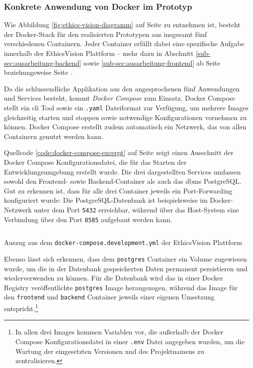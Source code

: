 \documentclass[a4paper,12pt,twoside]{scrreprt}
\begin{document}
\subsubsection*{Konkrete Anwendung von Docker im Prototyp}
\label{anwendung-docker}

Wie Abbildung \ref{fig:ethics-vision-diagramm} auf Seite \pageref{fig:ethics-vision-diagramm} zu entnehmen ist, besteht der Docker-Stack für den realisierten Prototypen aus insgesamt fünf verschiedenen Containern. Jeder Container erfüllt dabei eine spezifische Aufgabe innerhalb der EthicsVision Plattform -- mehr dazu in Abschnitt \ref{sub-sec:ausarbeitung-backend} sowie \ref{sub-sec:ausarbeitung-frontend} ab Seite \pageref{sub-sec:ausarbeitung-backend} beziehungsweise Seite \pageref{sub-sec:ausarbeitung-frontend}.

\medskip

Da die schlussendliche Applikation aus den angesprochenen fünf Anwendungen und Services besteht, kommt \textit{Docker Compose} zum Einsatz. Docker Compose stellt ein \ac{cli} Tool sowie ein \texttt{.yaml} Dateiformat zur Verfügung, um mehrere Images gleichzeitig starten und stoppen sowie notwendige Konfigurationen vornehmen zu können. Docker Compose erstellt zudem automatisch ein Netzwerk, das von allen Containern genutzt werden kann. \cite{montemagno_docker_2023, docker_inc_networking_compose_2023}

Quellcode \ref{code:docker-compose-excerpt} auf Seite \pageref{code:docker-compose-excerpt} zeigt einen Ausschnitt der Docker Compose Konfigurationsdatei, die für das Starten der Entwicklungsumgebung erstellt wurde. Die drei dargestellten Services umfassen sowohl den Frontend- sowie Backend-Container als auch das \ac{dbms} PostgreSQL. Gut zu erkennen ist, dass für alle drei Container jeweils ein Port-Forwarding konfiguriert wurde: Die PostgreSQL-Datenbank ist beispielsweise im Docker-Netzwerk unter dem Port \texttt{5432} erreichbar, während über das Host-System eine Verbindung über den Port \texttt{8585} aufgebaut werden kann. 

\begin{listing}[ht]
    \inputminted[fontsize=\footnotesize,linenos,xleftmargin=8mm]{yaml}{code/Luidold_Docker-Compose.yml}
    \caption{Auszug aus dem \texttt{docker-compose.development.yml} der EthicsVision Plattform}
    \label{code:docker-compose-excerpt}
\end{listing}

Ebenso lässt sich erkennen, dass dem \texttt{postgres} Container ein Volume zugewiesen wurde, um die in der Datenbank gespeicherten Daten permanent persistieren und wiederverwenden zu können. Für die Datenbank wird das in einer Docker Registry veröffentlichte \texttt{postgres} Image herangezogen, während das Image für den \texttt{frontend} und \texttt{backend} Container jeweils einer eigenen Umsetzung entspricht.\footnote{In allen drei Images kommen Variablen vor, die außerhalb der Docker Compose Konfigurationsdatei in einer \texttt{.env} Datei angegeben wurden, um die Wartung der eingesetzten Versionen und des Projektnamens zu zentralisieren.}
\end{document}
